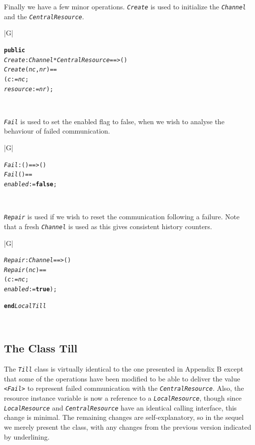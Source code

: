 \documentclass[\pformat,12pt,twoside]{article}
\newenvironment{VDMgray}%
{\begin{tabular}{|G|}\hline\small\begin{alltt}}%
{\end{alltt}\normalsize\\
 \hline\end{tabular}}
\begin{document}
Finally we have a few minor operations. \texttt{\emph{Create}} is used
to initialize the \texttt{\emph{Channel}} and the
\texttt{\emph{CentralResource}}.

\begin{VDMgray}
 \textbf{public}
 \textit{Create} : \textit{Channel} * \textit{CentralResource} ==\texttt{>} ()
 \textit{Create}(\textit{nc}, \textit{nr}) ==
   (\textit{c} := \textit{nc};
    \textit{resource} := \textit{nr});
\end{VDMgray}


\texttt{\emph{Fail}} is used to set the enabled flag to false, when we wish to 
analyse the behaviour of failed communication.

\begin{VDMgray}
 \textit{Fail} : () ==\texttt{>} ()
 \textit{Fail}() ==
   \textit{enabled} := \textbf{false};
\end{VDMgray}


\texttt{\emph{Repair}} is used if we wish to reset the communication
following a failure. Note that a fresh \texttt{\emph{Channel}} is used
as this gives consistent history counters.

\begin{VDMgray}
 \textit{Repair} : \textit{Channel} ==\texttt{>} ()
 \textit{Repair}(\textit{nc}) ==
   (\textit{c} := \textit{nc};
    \textit{enabled} := \textbf{true});

\textbf{end} \textit{LocalTill}
\end{VDMgray}


\subsection{The Class Till}

The \texttt{\emph{Till}} class is virtually identical to the one
presented in Appendix B except that some of the operations have been
modified to be able to deliver the value
\texttt{<}\texttt{\emph{Fail}}\texttt{>} to represent failed
communication with the \texttt{\emph{CentralResource}}. Also, the
resource instance variable is now a reference to a
\texttt{\emph{LocalResource}}, though since
\texttt{\emph{LocalResource}} and \texttt{\emph{CentralResource}} have
an identical calling interface, this change is minimal. The remaining
changes are self-explanatory, so in the sequel we merely present the
class, with any changes from the previous version indicated by
underlining.
\end{document}
